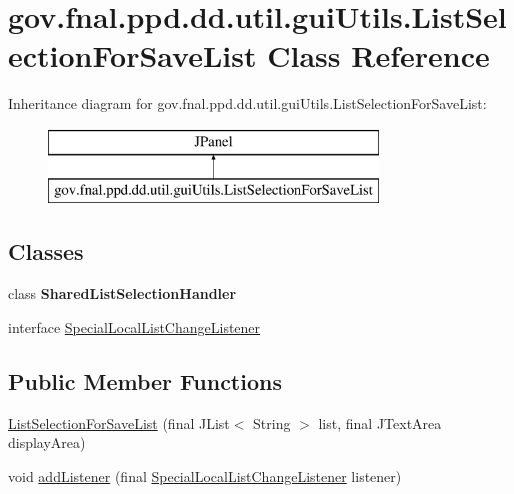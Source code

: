 \hypertarget{classgov_1_1fnal_1_1ppd_1_1dd_1_1util_1_1guiUtils_1_1ListSelectionForSaveList}{\section{gov.\-fnal.\-ppd.\-dd.\-util.\-gui\-Utils.\-List\-Selection\-For\-Save\-List Class Reference}
\label{classgov_1_1fnal_1_1ppd_1_1dd_1_1util_1_1guiUtils_1_1ListSelectionForSaveList}
}
Inheritance diagram for gov.\-fnal.\-ppd.\-dd.\-util.\-gui\-Utils.\-List\-Selection\-For\-Save\-List\-:\begin{figure}[H]
\begin{center}
\leavevmode
\includegraphics[height=2.000000cm]{classgov_1_1fnal_1_1ppd_1_1dd_1_1util_1_1guiUtils_1_1ListSelectionForSaveList}
\end{center}
\end{figure}
\subsection*{Classes}
\begin{DoxyCompactItemize}
\item 
class {\bfseries Shared\-List\-Selection\-Handler}
\item 
interface \hyperlink{interfacegov_1_1fnal_1_1ppd_1_1dd_1_1util_1_1guiUtils_1_1ListSelectionForSaveList_1_1SpecialLocalListChangeListener}{Special\-Local\-List\-Change\-Listener}
\end{DoxyCompactItemize}
\subsection*{Public Member Functions}
\begin{DoxyCompactItemize}
\item 
\hyperlink{classgov_1_1fnal_1_1ppd_1_1dd_1_1util_1_1guiUtils_1_1ListSelectionForSaveList_afce0e8cb3768a9e8d2902fd60c7f2cdd}{List\-Selection\-For\-Save\-List} (final J\-List$<$ String $>$ list, final J\-Text\-Area display\-Area)
\item 
void \hyperlink{classgov_1_1fnal_1_1ppd_1_1dd_1_1util_1_1guiUtils_1_1ListSelectionForSaveList_a92b1df0732f399ec324bb90923b370e8}{add\-Listener} (final \hyperlink{interfacegov_1_1fnal_1_1ppd_1_1dd_1_1util_1_1guiUtils_1_1ListSelectionForSaveList_1_1SpecialLocalListChangeListener}{Special\-Local\-List\-Change\-Listener} listener)
\end{DoxyCompactItemize}


